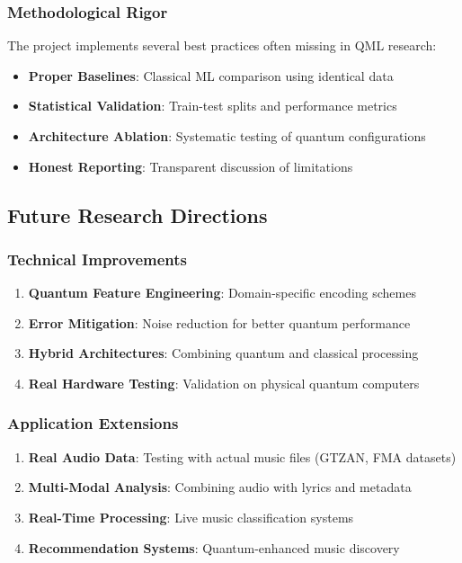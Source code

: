 \documentclass[11pt,a4paper]{article}
\begin{document}
\subsubsection{Methodological Rigor}
The project implements several best practices often missing in QML research:
\begin{itemize}
    \item \textbf{Proper Baselines}: Classical ML comparison using identical data
    \item \textbf{Statistical Validation}: Train-test splits and performance metrics
    \item \textbf{Architecture Ablation}: Systematic testing of quantum configurations
    \item \textbf{Honest Reporting}: Transparent discussion of limitations
\end{itemize}

\subsection{Future Research Directions}

\subsubsection{Technical Improvements}
\begin{enumerate}
    \item \textbf{Quantum Feature Engineering}: Domain-specific encoding schemes
    \item \textbf{Error Mitigation}: Noise reduction for better quantum performance
    \item \textbf{Hybrid Architectures}: Combining quantum and classical processing
    \item \textbf{Real Hardware Testing}: Validation on physical quantum computers
\end{enumerate}

\subsubsection{Application Extensions}
\begin{enumerate}
    \item \textbf{Real Audio Data}: Testing with actual music files (GTZAN, FMA datasets)
    \item \textbf{Multi-Modal Analysis}: Combining audio with lyrics and metadata
    \item \textbf{Real-Time Processing}: Live music classification systems
    \item \textbf{Recommendation Systems}: Quantum-enhanced music discovery
\end{enumerate}
\end{document}
